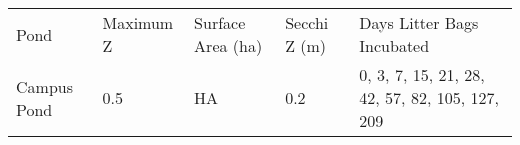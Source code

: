 \begin{table}
\label{tab:ponds}
\begin{tabular}{l l l l l}
Pond & Maximum Z & Surface Area (ha) & Secchi Z (m) & Days Litter Bags Incubated \\
Campus Pond & 0.5 & HA & 0.2 & 0, 3, 7, 15, 21, 28, 42, 57, 82, 105, 127, 209\\

\end{tabular}
\end{table}